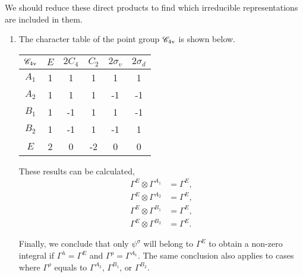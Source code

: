 \documentclass[a4paper]{book}
\begin{document}
	\begin{solution}
	
		We should reduce these direct products to find which irreducible representations are included in them.
		
		\begin{enumerate}[label=(\alph*)]
		
		\item The character table of the point group $\mathscr{C}_{\rm 4v}$ is shown below.
		\begin{center}
		\begin{tabular}{cccccc}\hline
	$\mathscr{C}_{\rm 4v}$ & $E$ & $2C_4$ & $C_2$ & $2\sigma_v$ & $2\sigma_d$ \\ \hline
			$A_1$	&	1	&	1	&	1	&	1	&	1	\\
			$A_2$	&	1	&	1	&	1	&	-1	&	-1	\\
			$B_1$	&	1	&	-1	&	1	&	1	&	-1	\\
			$B_2$	&	1	&	-1	&	1	&	-1	&	1	\\
			$E$		&	2	&	0	&	-2	&	0	&	0\\ \hline
		\end{tabular}
		\end{center}
		These results can be calculated,
		\begin{align}
			\Gamma^{E} \otimes \Gamma^{A_1} &= \Gamma^E , \\
			\Gamma^{E} \otimes \Gamma^{A_2} &= \Gamma^E , \\
			\Gamma^{E} \otimes \Gamma^{B_1} &= \Gamma^E , \\
			\Gamma^{E} \otimes \Gamma^{B_2} &= \Gamma^E .
		\end{align}
		
		Finally, we conclude that only $\psi^\sigma$ will belong to $\Gamma^E$ to obtain a non-zero integral if $\Gamma^\lambda = \Gamma^E$ and $\Gamma^\rho = \Gamma^{A_1}$. The same conclusion also applies to cases where $\Gamma^\rho$ equals to $\Gamma^{A_2}$, $\Gamma^{B_1}$, or $\Gamma^{B_2}$.
		

\end{enumerate}
\end{solution}
\end{document}
